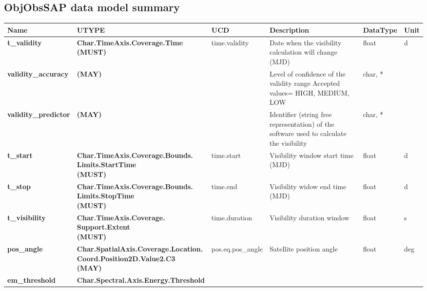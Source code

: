 \documentclass[11pt,a4paper]{ivoatex/ivoa}
\begin{document}
\begin{appendices}
\section{ObjObsSAP data model summary}
\FloatBarrier
\begin{table}[h]
\tiny
\centering
\begin{adjustbox}{angle=90}
\begin{tabular}{|p{25mm}|p{50mm}|p{20mm}|p{40mm}|p{15mm}|p{10mm}|}
\hline
Name & UTYPE & UCD & Description & DataType & Unit \\
\hline
\textbf{t\_validity} & \textbf{Char.TimeAxis.Coverage.Time  \newline
(MUST)} &
time.validity & Date when the \newline
visibility calculation will change (MJD) &
float & d \\
\hline
\textbf{validity\_accuracy} & \textbf{(MAY)} & & Level of confidence
of the validity range \newline
Accepted values= HIGH, MEDIUM, LOW & char, * & \\
\hline
\textbf{validity\_predictor} & \textbf{(MAY)} & & Identifier (string
free representation) of the software used to calculate the visibility &
char, * & \\
\hline
\textbf{t\_start} & \textbf{
Char.TimeAxis.Coverage.Bounds. \newline
Limits.StartTime  \newline
(MUST)} & time.start &
Visibility window start time (MJD) & float & d \\
\hline
\textbf{t\_stop} & \textbf{
Char.TimeAxis.Coverage.Bounds. \newline
Limits.StopTime \newline
(MUST)} & time.end &
Visibility widow end time (MJD) & float & d \\
\hline
\textbf{t\_visibility} & \textbf{
Char.TimeAxis.Coverage. \newline
Support.Extent  \newline
(MUST)} & time.duration &
Visibility duration window & float & s \\
\hline
\textbf{pos\_angle} & \textbf{
Char.SpatialAxis.Coverage.Location. \newline
Coord.Position2D.Value2.C3  \newline
(MAY)} &
pos.eq.pos\_angle & Satellite position angle & float & deg \\
\hline
\textbf{em\_threshold} & \textbf{
Char.Spectral.Axis.Energy.Threshold \newline
}
\end{tabular}
\end{adjustbox}
\end{table}
\end{appendices}
\end{document}
